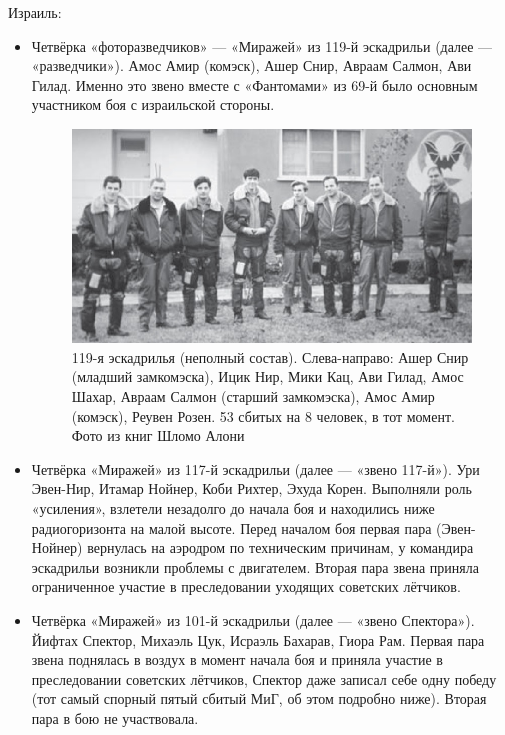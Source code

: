 Израиль:
\begin{itemize}
	\item Четвёрка «фоторазведчиков» — «Миражей» из 119-й эскадрильи (далее — «разведчики»). Амос Амир (комэск), Ашер Снир, Авраам Салмон, Ави Гилад. Именно это звено вместе с «Фантомами» из 69-й было основным участником боя с израильской стороны.
	\begin{figure}[h!tb] 
		\centering\includegraphics[scale=0.4]{Dolina_4/FWa94mCdeK8.jpg}
		\caption{119-я эскадрилья (неполный состав). Слева-направо: Ашер Снир (младший замкомэска), Ицик Нир, Мики Кац, Ави Гилад, Амос Шахар, Авраам Салмон (старший замкомэска), Амос Амир (комэск), Реувен Розен. 53 сбитых на 8 человек, в тот момент. Фото из книг Шломо Алони}%
	\end{figure}
	\item Четвёрка «Миражей» из 117-й эскадрильи (далее — «звено 117-й»). Ури Эвен-Нир, Итамар Нойнер, Коби Рихтер, Эхуда Корен. Выполняли роль «усиления», взлетели незадолго до начала боя и находились ниже радиогоризонта на малой высоте. Перед началом боя первая пара (Эвен-Нойнер) вернулась на аэродром по техническим причинам, у командира эскадрильи возникли проблемы с двигателем. Вторая пара звена приняла ограниченное участие в преследовании уходящих советских лётчиков.
	\item Четвёрка «Миражей» из 101-й эскадрильи (далее — «звено Спектора»). Йифтах Спектор, Михаэль Цук, Исраэль Бахарав, Гиора Рам. Первая пара звена поднялась в воздух в момент начала боя и приняла участие в преследовании советских лётчиков, Спектор даже записал себе одну победу (тот самый спорный пятый сбитый МиГ, об этом подробно ниже). Вторая пара в бою не участвовала. 

\end{itemize}
